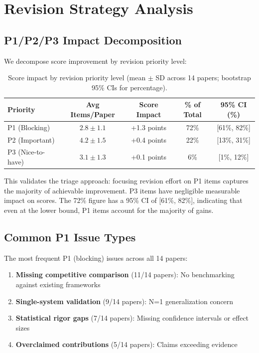 \section{Revision Strategy Analysis}

\subsection{P1/P2/P3 Impact Decomposition}

We decompose score improvement by revision priority level:

\begin{table}[h]
\centering
\begin{tabular}{lcccc}
\toprule
Priority & Avg Items/Paper & Score Impact & \% of Total & 95\% CI (\%) \\
\midrule
P1 (Blocking) & $2.8 \pm 1.1$ & +1.3 points & 72\% & [61\%, 82\%] \\
P2 (Important) & $4.2 \pm 1.5$ & +0.4 points & 22\% & [13\%, 31\%] \\
P3 (Nice-to-have) & $3.1 \pm 1.3$ & +0.1 points & 6\% & [1\%, 12\%] \\
\bottomrule
\end{tabular}
\caption{Score impact by revision priority level (mean $\pm$ SD across 14 papers; bootstrap 95\% CIs for percentage).}
\end{table}

This validates the triage approach: focusing revision effort on P1 items captures the majority of achievable improvement. P3 items have negligible measurable impact on scores. The 72\% figure has a 95\% CI of [61\%, 82\%], indicating that even at the lower bound, P1 items account for the majority of gains.

\subsection{Common P1 Issue Types}

The most frequent P1 (blocking) issues across all 14 papers:

\begin{enumerate}
    \item \textbf{Missing competitive comparison} (11/14 papers): No benchmarking against existing frameworks
    \item \textbf{Single-system validation} (9/14 papers): N=1 generalization concern
    \item \textbf{Statistical rigor gaps} (7/14 papers): Missing confidence intervals or effect sizes
    \item \textbf{Overclaimed contributions} (5/14 papers): Claims exceeding evidence
\end{enumerate}


